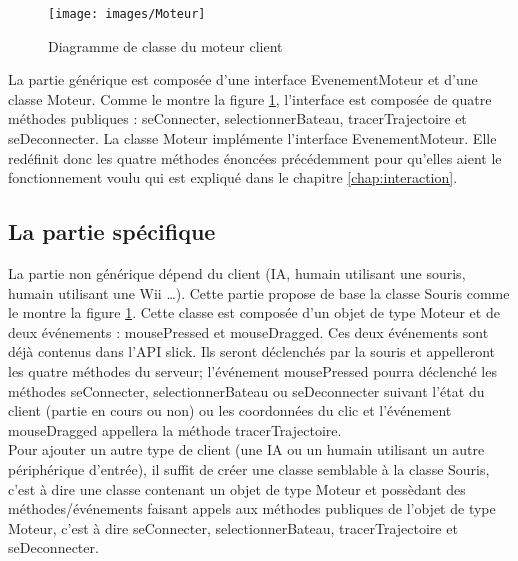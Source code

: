 \begin{figure}[h]
	\begin{center}
		\texttt{[image: images/Moteur]}
	\end{center}
	\caption{Diagramme de classe du moteur client}
	\label{fig:partieGeneriqueMoteurClient}
\end{figure}

La partie générique est composée d'une interface EvenementMoteur et d'une classe Moteur. Comme le montre la figure \ref{fig:partieGeneriqueMoteurClient}, l'interface est composée de quatre méthodes publiques : seConnecter, selectionnerBateau, tracerTrajectoire et seDeconnecter. La classe Moteur implémente l'interface EvenementMoteur. Elle redéfinit donc les quatre méthodes énoncées précédemment pour qu'elles aient le fonctionnement voulu qui est expliqué dans le chapitre \ref{chap:interaction}.

\subsection{La partie spécifique}
La partie non générique dépend du client (IA, humain utilisant une souris, humain utilisant une Wii \dots{}). Cette partie propose de base la classe Souris comme le montre la figure \ref{fig:partieGeneriqueMoteurClient}. Cette classe est composée d'un objet de type Moteur et de deux événements : mousePressed et mouseDragged. Ces deux événements sont déjà contenus dans l'API slick. Ils seront déclenchés par la souris et appelleront les quatre méthodes du serveur; l'événement mousePressed pourra déclenché les méthodes seConnecter, selectionnerBateau ou seDeconnecter suivant l'état du client (partie en cours ou non) ou les coordonnées du clic et l'événement mouseDragged appellera la méthode tracerTrajectoire.\\

Pour ajouter un autre type de client (une IA ou un humain utilisant un autre périphérique d'entrée), il suffit de créer une classe semblable à la classe Souris, c'est à dire une classe contenant un objet de type Moteur et possèdant des méthodes/événements faisant appels aux méthodes publiques de l'objet de type Moteur, c'est à dire seConnecter, selectionnerBateau, tracerTrajectoire et seDeconnecter.
